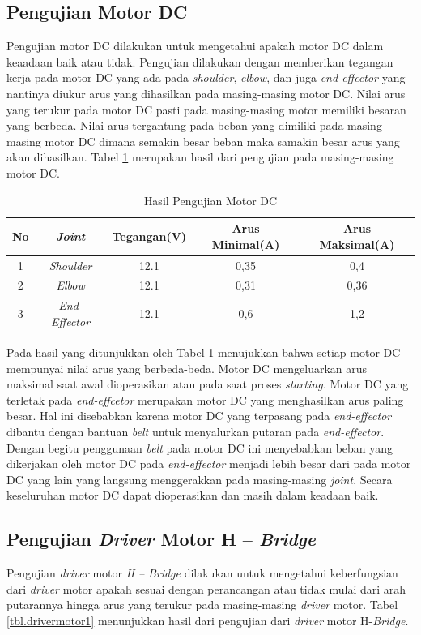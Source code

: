 \subsection{Pengujian Motor DC}
Pengujian motor DC dilakukan untuk mengetahui apakah motor DC dalam keaadaan baik atau tidak. Pengujian dilakukan dengan memberikan tegangan kerja pada motor DC yang ada pada \textit{shoulder}, \textit{elbow}, dan juga \textit{end-effector} yang nantinya diukur arus yang dihasilkan pada masing-masing motor DC. Nilai arus yang terukur pada motor DC pasti pada masing-masing motor memiliki besaran yang berbeda. Nilai arus tergantung pada beban yang dimiliki pada masing-masing motor DC dimana semakin besar beban maka samakin besar arus yang akan dihasilkan. Tabel \ref{tbl.motordc} merupakan hasil dari pengujian pada masing-masing motor DC.

\begin{table}[h]
		\centering
	\caption{Hasil Pengujian Motor DC}
	\label{tbl.motordc}
	\begin{tabular}{|c|c|c|c|c|}
		\hline
		\rowcolor[HTML]{9B9B9B} 
		No & \textit{Joint}        & Tegangan(V) & Arus Minimal(A) & Arus Maksimal(A)\\ \hline
		1  & \textit{Shoulder}     & 12.1        &   0,35       & 0,4 \\ \hline
		2  & \textit{Elbow}        & 12.1        &   0,31       & 0,36\\ \hline
		3  & \textit{End-Effector} & 12.1        &   0,6      & 1,2\\ \hline
	\end{tabular}
\end{table}

Pada hasil yang ditunjukkan oleh Tabel \ref{tbl.motordc} menujukkan bahwa setiap motor DC mempunyai nilai arus yang berbeda-beda. Motor DC mengeluarkan arus maksimal saat awal dioperasikan atau pada saat proses \textit{starting. }Motor DC yang terletak pada \textit{end-effcetor} merupakan motor DC yang menghasilkan arus paling besar. Hal ini disebabkan karena motor DC yang terpasang pada \textit{end-effector} dibantu dengan bantuan \textit{belt} untuk menyalurkan putaran pada\textit{ end-effector}. Dengan begitu penggunaan \textit{belt} pada motor DC ini menyebabkan beban yang dikerjakan oleh motor DC pada \textit{end-effector} menjadi lebih besar dari pada motor DC yang lain yang langsung menggerakkan pada masing-masing \textit{joint}. Secara keseluruhan motor DC dapat dioperasikan dan masih dalam keadaan baik.

\subsection{Pengujian \textit{Driver} Motor H – \textit{Bridge}}
Pengujian \textit{driver} motor\textit{ H –} \textit{Bridge} dilakukan untuk mengetahui keberfungsian dari \textit{driver} motor apakah sesuai dengan perancangan atau tidak mulai dari arah putarannya hingga arus yang terukur pada masing-masing \textit{driver} motor. Tabel \ref{tbl.drivermotor1} menunjukkan hasil dari pengujian dari \textit{driver} motor H-\textit{Bridge}. 

